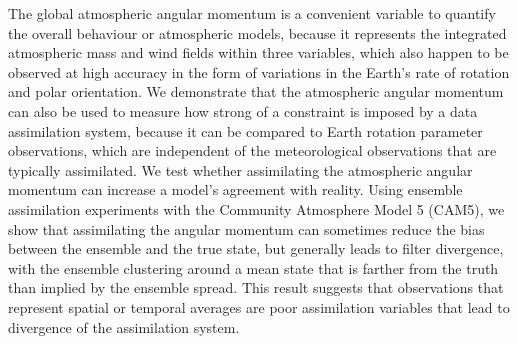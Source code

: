 The global atmospheric angular momentum is a convenient variable to quantify the overall behaviour or atmospheric models, because it represents the integrated atmospheric mass and wind fields within three variables, which also happen to be observed at high accuracy in the form of variations in the Earth's rate of rotation and polar orientation. 
%
We demonstrate that the atmospheric angular momentum can also be used to measure how strong of a constraint is imposed by a data assimilation system, because it can be compared to Earth rotation parameter observations, which are independent of the meteorological observations that are typically assimilated.  
%
We test whether assimilating the atmospheric angular momentum can increase a model's agreement with reality. 
Using ensemble assimilation experiments with the Community Atmosphere Model 5 (CAM5), we show that  
assimilating the angular momentum can sometimes reduce the bias between the ensemble and the true state, but generally leads to filter divergence, with the ensemble clustering around a mean state that is farther from the truth than implied by the ensemble spread. 
This result suggests that observations that represent spatial or temporal averages are poor assimilation variables that lead to divergence of the assimilation system.  
